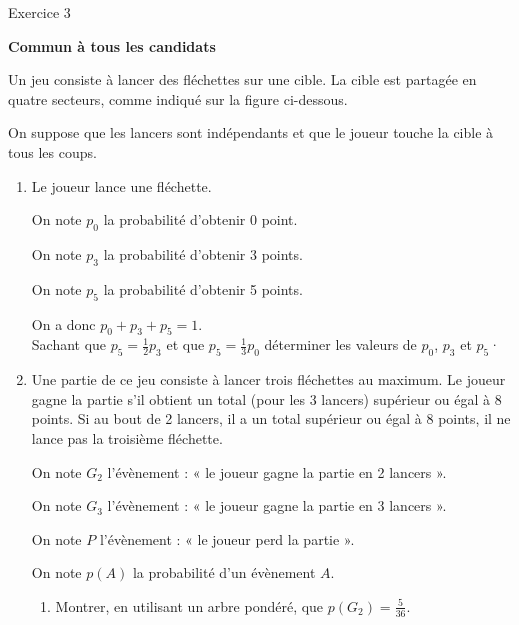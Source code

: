 
%
\begin{h2}Exercice 3\end{h2}
\textbf{Commun  à tous les candidats}
\par
Un jeu consiste à lancer des fléchettes sur une cible. La cible est partagée en quatre secteurs, comme indiqué sur la figure ci-dessous.


\begin{center}
\end{center}
On suppose que les lancers sont indépendants et que le joueur touche la cible à tous les coups.
\begin{enumerate}
     \item
     Le joueur lance une fléchette.
     \par
     On note $p_{0}$ la probabilité d'obtenir 0 point.
     \par
     On note $p_{3}$ la probabilité d'obtenir 3 points.
     \par
     On note $p_{5}$ la probabilité d'obtenir 5 points.
     \par
     On a donc $p_{0}+p_{3}+p_{5}=1$. 
\\
Sachant que $p_{5}=\frac{1}{2}p_{3}$ et que $p_{5}=\frac{1}{3}p_{0}$ déterminer les valeurs de $p_{0}$, $p_{3}$ et $p_{5}$·
     \item
     Une partie de ce jeu consiste à lancer trois fléchettes au maximum. Le joueur gagne la partie s'il obtient un total (pour les 3 lancers) supérieur ou égal à 8 points. Si au bout de 2 lancers, il a un total supérieur ou égal à 8 points, il ne lance pas la troisième fléchette.
     \par
     On note $G_{2}$ l'évènement : « le joueur gagne la partie en 2 lancers ».
     \par
     On note $G_{3}$ l'évènement : « le joueur gagne la partie en 3 lancers ».
     \par
     On note $P$ l'évènement : « le joueur perd la partie ».
     \par
     On note $p\left(A\right)$ la probabilité d'un évènement $A$.
     \begin{enumerate}[label=\alph*.]
          \item
          Montrer, en utilisant un arbre pondéré, que $p\left(G_{2}\right)=\frac{5}{36}$.

\end{enumerate}
\end{enumerate}
